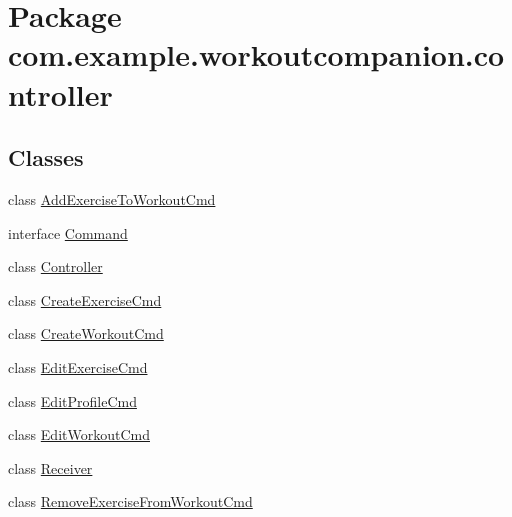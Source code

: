 \hypertarget{namespacecom_1_1example_1_1workoutcompanion_1_1controller}{\section{Package com.\-example.\-workoutcompanion.\-controller}
\label{namespacecom_1_1example_1_1workoutcompanion_1_1controller}
}
\subsection*{Classes}
\begin{DoxyCompactItemize}
\item 
class \hyperlink{classcom_1_1example_1_1workoutcompanion_1_1controller_1_1_add_exercise_to_workout_cmd}{Add\-Exercise\-To\-Workout\-Cmd}
\item 
interface \hyperlink{interfacecom_1_1example_1_1workoutcompanion_1_1controller_1_1_command}{Command}
\item 
class \hyperlink{classcom_1_1example_1_1workoutcompanion_1_1controller_1_1_controller}{Controller}
\item 
class \hyperlink{classcom_1_1example_1_1workoutcompanion_1_1controller_1_1_create_exercise_cmd}{Create\-Exercise\-Cmd}
\item 
class \hyperlink{classcom_1_1example_1_1workoutcompanion_1_1controller_1_1_create_workout_cmd}{Create\-Workout\-Cmd}
\item 
class \hyperlink{classcom_1_1example_1_1workoutcompanion_1_1controller_1_1_edit_exercise_cmd}{Edit\-Exercise\-Cmd}
\item 
class \hyperlink{classcom_1_1example_1_1workoutcompanion_1_1controller_1_1_edit_profile_cmd}{Edit\-Profile\-Cmd}
\item 
class \hyperlink{classcom_1_1example_1_1workoutcompanion_1_1controller_1_1_edit_workout_cmd}{Edit\-Workout\-Cmd}
\item 
class \hyperlink{classcom_1_1example_1_1workoutcompanion_1_1controller_1_1_receiver}{Receiver}
\item 
class \hyperlink{classcom_1_1example_1_1workoutcompanion_1_1controller_1_1_remove_exercise_from_workout_cmd}{Remove\-Exercise\-From\-Workout\-Cmd}
\end{DoxyCompactItemize}
